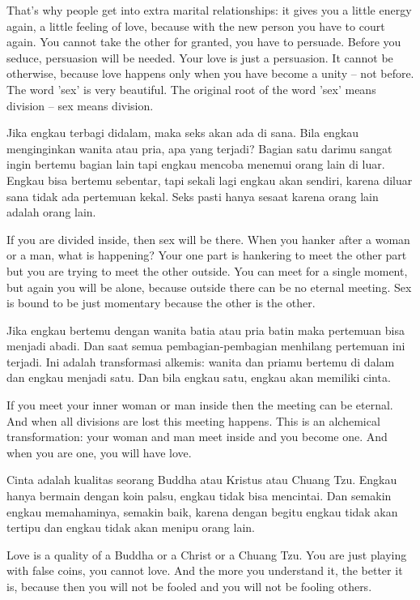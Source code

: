 \english
That's why people get into extra marital relationships: it gives you a little energy again, a little feeling of love, because with the new person you have to court again. You cannot take the other for granted, you have to persuade. Before you seduce, persuasion will be needed. Your love is just a persuasion. It cannot be otherwise, because love happens only when you have become a unity -- not before. The word 'sex' is very beautiful. The original root of the word 'sex' means division -- sex means division.

\bahasa
Jika engkau terbagi didalam, maka seks akan ada di sana. Bila engkau menginginkan wanita atau pria, apa yang terjadi? Bagian satu darimu sangat ingin bertemu bagian lain tapi engkau mencoba menemui orang lain di luar. Engkau bisa bertemu sebentar, tapi sekali lagi engkau akan sendiri, karena diluar sana tidak ada pertemuan kekal. Seks pasti hanya sesaat karena orang lain adalah orang lain.

\english
If you are divided inside, then sex will be there. When you hanker after a woman or a man, what is happening? Your one part is hankering to meet the other part but you are trying to meet the other outside. You can meet for a single moment, but again you will be alone, because outside there can be no eternal meeting. Sex is bound to be just momentary because the other is the other.

\bahasa
Jika engkau bertemu dengan wanita batia atau pria batin maka pertemuan bisa menjadi abadi. Dan saat semua pembagian-pembagian menhilang pertemuan ini terjadi. Ini adalah transformasi alkemis: wanita dan priamu bertemu di dalam dan engkau menjadi satu. Dan bila engkau satu, engkau akan memiliki cinta.

\english
If you meet your inner woman or man inside then the meeting can be eternal. And when all divisions are lost this meeting happens. This is an alchemical transformation: your woman and man meet inside and you become one. And when you are one, you will have love.

\bahasa
Cinta adalah kualitas seorang Buddha atau Kristus atau Chuang Tzu. Engkau hanya bermain dengan koin palsu, engkau tidak bisa mencintai. Dan semakin engkau memahaminya, semakin baik, karena dengan begitu engkau tidak akan tertipu dan engkau tidak akan menipu orang lain.

\english
Love is a quality of a Buddha or a Christ or a Chuang Tzu. You are just playing with false coins, you cannot love. And the more you understand it, the better it is, because then you will not be fooled and you will not be fooling others.

